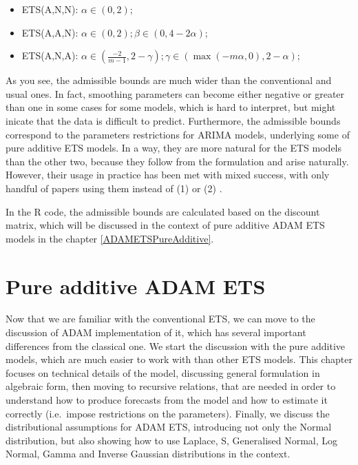 \documentclass[
]{book}
\providecommand{\tightlist}{%
  \setlength{\itemsep}{0pt}\setlength{\parskip}{0pt}}
\theoremstyle{definition}
\theoremstyle{definition}
\theoremstyle{definition}
\theoremstyle{definition}
\theoremstyle{remark}
\begin{document}
\begin{itemize}
\tightlist
\item
  ETS(A,N,N): \(\alpha \in (0, 2)\);
\item
  ETS(A,A,N): \(\alpha \in (0, 2); \beta \in (0, 4-2\alpha)\);
\item
  ETS(A,N,A): \(\alpha \in \left(\frac{-2}{m-1}, 2-\gamma\right); \gamma \in (\max(-m\alpha, 0), 2-\alpha)\);
\end{itemize}

As you see, the admissible bounds are much wider than the conventional and usual ones. In fact, smoothing parameters can become either negative or greater than one in some cases for some models, which is hard to interpret, but might inicate that the data is difficult to predict. Furthermore, the admissible bounds correspond to the parameters restrictions for ARIMA models, underlying some of pure additive ETS models. In a way, they are more natural for the ETS models than the other two, because they follow from the formulation and arise naturally. However, their usage in practice has been met with mixed success, with only handful of papers using them instead of (1) or (2) \citep[e.g.][ mention that they appear in some cases and \citet{Snyder2017} use them in their model]{Gardner2008}.

In the R code, the admissible bounds are calculated based on the discount matrix, which will be discussed in the context of pure additive ADAM ETS models in the chapter \ref{ADAMETSPureAdditive}.

\hypertarget{ADAMETSIntroduction}{%
\chapter{Pure additive ADAM ETS}\label{ADAMETSIntroduction}}

Now that we are familiar with the conventional ETS, we can move to the discussion of ADAM implementation of it, which has several important differences from the classical one. We start the discussion with the pure additive models, which are much easier to work with than other ETS models. This chapter focuses on technical details of the model, discussing general formulation in algebraic form, then moving to recursive relations, that are needed in order to understand how to produce forecasts from the model and how to estimate it correctly (i.e.~impose restrictions on the parameters). Finally, we discuss the distributional assumptions for ADAM ETS, introducing not only the Normal distribution, but also showing how to use Laplace, S, Generalised Normal, Log Normal, Gamma and Inverse Gaussian distributions in the context.
\end{document}
